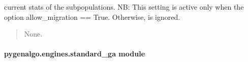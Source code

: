 \documentclass[letterpaper,10pt,english]{sphinxmanual}
\begin{document}
\begin{fulllineitems}
\begin{fulllineitems}
\begin{quote}
\begin{description}
\end{description}\end{quote}

\sphinxAtStartPar
current stats of the subpopulations. NB: This setting is active only when the option
allow\_migration == True. Otherwise, is ignored.
\begin{quote}\begin{description}
\sphinxAtStartPar
None.

\end{description}\end{quote}

\end{fulllineitems}


\end{fulllineitems}



\paragraph{pygenalgo.engines.standard\_ga module}
\label{\detokenize{pygenalgo.engines:module-pygenalgo.engines.standard_ga}}\label{\detokenize{pygenalgo.engines:pygenalgo-engines-standard-ga-module}}
\end{document}
